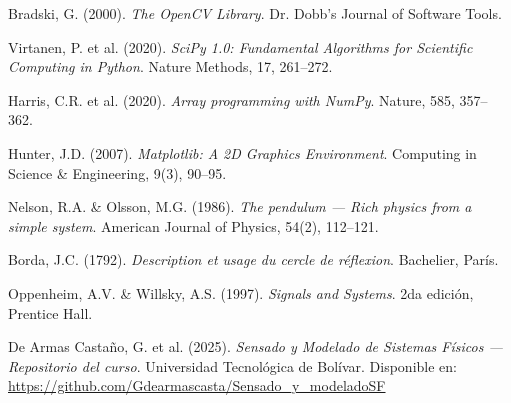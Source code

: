 \documentclass[12pt,a4paper]{article}
\begin{document}
\begin{enumerate}[label={[\arabic*]}]
    \item Bradski, G. (2000). \textit{The OpenCV Library}. Dr. Dobb's Journal of Software Tools.
    \item Virtanen, P. et al. (2020). \textit{SciPy 1.0: Fundamental Algorithms for Scientific Computing in Python}. Nature Methods, 17, 261--272.
    \item Harris, C.R. et al. (2020). \textit{Array programming with NumPy}. Nature, 585, 357--362.
    \item Hunter, J.D. (2007). \textit{Matplotlib: A 2D Graphics Environment}. Computing in Science \& Engineering, 9(3), 90--95.
    \item Nelson, R.A. \& Olsson, M.G. (1986). \textit{The pendulum — Rich physics from a simple system}. American Journal of Physics, 54(2), 112--121.
    \item Borda, J.C. (1792). \textit{Description et usage du cercle de réflexion}. Bachelier, París.
    \item Oppenheim, A.V. \& Willsky, A.S. (1997). \textit{Signals and Systems}. 2da edición, Prentice Hall.
    \item De Armas Castaño, G. et al. (2025). \textit{Sensado y Modelado de Sistemas Físicos — Repositorio del curso}. Universidad Tecnológica de Bolívar. Disponible en: \url{https://github.com/Gdearmascasta/Sensado_y_modeladoSF}
\end{enumerate}
\end{document}
